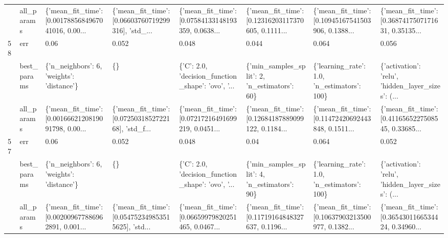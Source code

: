 \begin{tabular}{llllllll}
   & all\_params &  \{'mean\_fit\_time': [0.0017885684967041016, 0.00... &  \{'mean\_fit\_time': [0.06603760719299316], 'std\_... &  \{'mean\_fit\_time': [0.07584133148193359, 0.0638... &  \{'mean\_fit\_time': [0.12316203117370605, 0.1111... &  \{'mean\_fit\_time': [0.10945167541503906, 0.1388... &  \{'mean\_fit\_time': [0.3687417507171631, 0.35135... \\
58 & err &                                               0.06 &                                              0.052 &                                              0.048 &                                              0.044 &                                              0.064 &                                              0.056 \\
   & best\_params &          \{'n\_neighbors': 6, 'weights': 'distance'\} &                                                 \{\} &  \{'C': 2.0, 'decision\_function\_shape': 'ovo', '... &       \{'min\_samples\_split': 2, 'n\_estimators': 60\} &        \{'learning\_rate': 1.0, 'n\_estimators': 100\} &  \{'activation': 'relu', 'hidden\_layer\_sizes': (... \\
   & all\_params &  \{'mean\_fit\_time': [0.0016662120819091798, 0.00... &  \{'mean\_fit\_time': [0.0725031852722168], 'std\_f... &  \{'mean\_fit\_time': [0.07217216491699219, 0.0451... &  \{'mean\_fit\_time': [0.12684187889099122, 0.1184... &  \{'mean\_fit\_time': [0.11472420692443848, 0.1511... &  \{'mean\_fit\_time': [0.4116565227508545, 0.33685... \\
57 & err &                                               0.06 &                                              0.052 &                                              0.048 &                                               0.04 &                                              0.064 &                                              0.052 \\
   & best\_params &          \{'n\_neighbors': 6, 'weights': 'distance'\} &                                                 \{\} &  \{'C': 2.0, 'decision\_function\_shape': 'ovo', '... &       \{'min\_samples\_split': 4, 'n\_estimators': 90\} &        \{'learning\_rate': 1.0, 'n\_estimators': 100\} &  \{'activation': 'relu', 'hidden\_layer\_sizes': (... \\
   & all\_params &  \{'mean\_fit\_time': [0.002009677886962891, 0.001... &  \{'mean\_fit\_time': [0.054752349853515625], 'std... &  \{'mean\_fit\_time': [0.06659979820251465, 0.0467... &  \{'mean\_fit\_time': [0.11719164848327637, 0.1196... &  \{'mean\_fit\_time': [0.10637903213500977, 0.1382... &  \{'mean\_fit\_time': [0.3654301166534424, 0.34960... \\
\bottomrule
\end{tabular}
